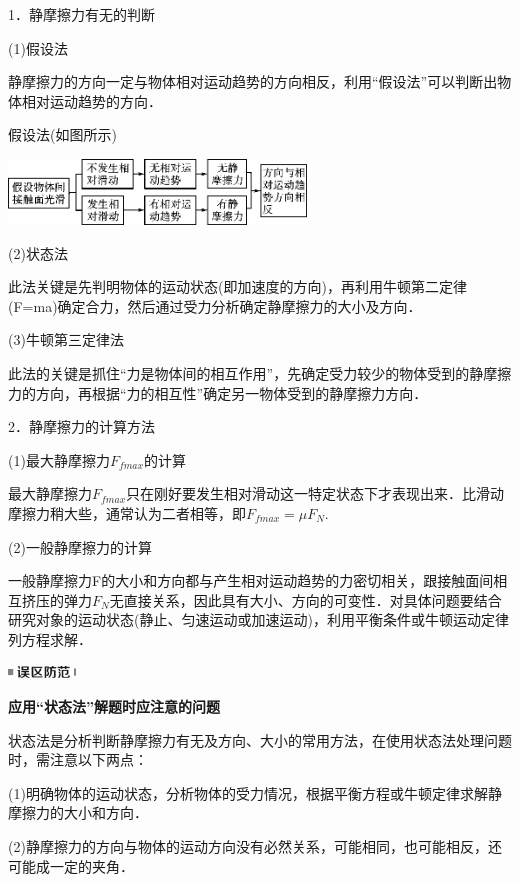 1．静摩擦力有无的判断

(1)假设法

静摩擦力的方向一定与物体相对运动趋势的方向相反，利用``假设法''可以判断出物体相对运动趋势的方向．

假设法(如图所示)

\begin{center}\includegraphics[width=3.11458in,height=0.6875in]{media/image48.png}\end{center}

(2)状态法

此法关键是先判明物体的运动状态(即加速度的方向)，再利用牛顿第二定律(F=ma)确定合力，然后通过受力分析确定静摩擦力的大小及方向．

(3)牛顿第三定律法

此法的关键是抓住``力是物体间的相互作用''，先确定受力较少的物体受到的静摩擦力的方向，再根据``力的相互性''确定另一物体受到的静摩擦力方向．

2．静摩擦力的计算方法

(1)最大静摩擦力$F_{fmax}$的计算

最大静摩擦力$F_{fmax}$只在刚好要发生相对滑动这一特定状态下才表现出来．比滑动摩擦力稍大些，通常认为二者相等，即$F_{fmax}=\mu F_N$.　

(2)一般静摩擦力的计算

一般静摩擦力F的大小和方向都与产生相对运动趋势的力密切相关，跟接触面间相互挤压的弹力$F_N$无直接关系，因此具有大小、方向的可变性．对具体问题要结合研究对象的运动状态(静止、匀速运动或加速运动)，利用平衡条件或牛顿运动定律列方程求解．



\begin{center}\includegraphics[width=0.70833in,height=0.125in]{media/image34.png}

\textbf{应用``状态法''解题时应注意的问题}
\end{center}


状态法是分析判断静摩擦力有无及方向、大小的常用方法，在使用状态法处理问题时，需注意以下两点：

(1)明确物体的运动状态，分析物体的受力情况，根据平衡方程或牛顿定律求解静摩擦力的大小和方向．

(2)静摩擦力的方向与物体的运动方向没有必然关系，可能相同，也可能相反，还可能成一定的夹角．
\newpage
